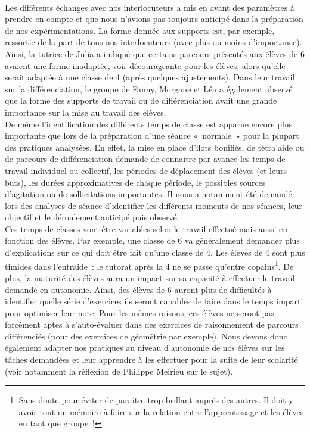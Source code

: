 \paragraph*{}
Les différents échanges avec nos interlocuteurs a mis en avant des paramètres à prendre en compte et que nous n'avions pas toujours anticipé dans la préparation de nos expérimentations. La forme donnée aux supports est, par exemple, ressortie de la part de tous nos interlocuteurs (avec plus ou moins d'importance). Ainsi, la tutrice de Julia a indiqué que certains parcours présentés aux élèves de 6 avaient une forme inadaptée, voir décourageante pour les élèves, alors qu'elle serait adaptée à une classe de 4 (après quelques ajustements). Dans leur travail sur la différenciation, le groupe de Fanny, Morgane et Léa a également observé que la forme des supports de travail ou de différenciation avait une grande importance sur la mise au travail des élèves. \\
De même l'identification des différents temps de classe est apparue encore plus importante que lors de la préparation d'une séance « normale » pour la plupart des pratiques analysées. En effet, la mise en place d'ilots bonifiés, de tétra'aide ou de parcours de différenciation demande de connaitre par avance les temps de travail individuel ou collectif, les périodes de déplacement des élèves (et leurs buts), les durées approximatives de chaque période, le possibles sources d'agitation ou de sollicitations importantes\ldots Il nous a notamment été demandé lors des analyses de séance d'identifier les différents moments de nos séances, leur objectif et le déroulement anticipé puis observé.\\
Ces temps de classes vont être variables selon le travail effectué mais aussi en fonction des élèves. Par exemple, une classe de 6 va généralement demander plus d'explications sur ce qui doit être fait qu'une classe de 4. Les élèves de 4 sont plus timides dans l'entraide : le tutorat après la 4 ne se passe qu'entre copains\footnote{Sans doute pour éviter de paraitre trop brillant auprès des autres. Il doit y avoir tout un mémoire à faire sur
la relation entre l'apprentissage et les élèves en tant que groupe !}.
De plus, la maturité des élèves aura un impact sur sa capacité à effectuer le travail demandé en autonomie. Ainsi, des élèves de 6 auront plus de difficultés à identifier quelle série d'exercices ils seront capables de faire dans le temps imparti pour optimiser leur note. Pour les mêmes raisons, ces élèves ne seront pas forcément aptes à s'auto-évaluer dans des exercices de raisonnement de parcours différenciés (pour des exercices de géométrie par exemple). Nous devons donc également adapter nos pratiques au niveau d'autonomie de nos élèves sur les tâches demandées et leur apprendre à les effectuer pour la suite de leur scolarité (voir notamment la réflexion de Philippe Meirieu\cite{Meirieu_autonomie} sur le sujet).\\
